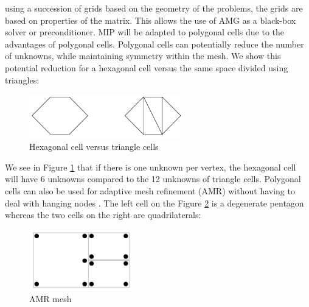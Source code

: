 using a succession of grids based on the geometry of the problems, the grids
are based on properties of the matrix. This allows the use of AMG as a black-box
solver or preconditioner. MIP will be adapted to polygonal cells due to the
advantages of polygonal cells. Polygonal cells can 
potentially reduce the number of unknowns, while maintaining symmetry 
within the mesh. We show this potential reduction for a hexagonal cell versus 
the same space divided using triangles:
\begin{figure}[H]
\centering
\includegraphics[width=0.6\textwidth]{./Introduction/hex_tri_cells}
\caption{Hexagonal cell versus triangle cells}
\label{fig_hex_tri}
\end{figure}
We see in Figure \ref{fig_hex_tri} that if there is one unknown per vertex, 
the hexagonal cell will have 6
unknowns compared to the 12 unknowns of triangle cells. Polygonal cells can
also be used for adaptive mesh refinement (AMR) without having to
deal with hanging nodes 
\cite{locally_hanging_nodes,arbitrary_hanging_nodes,dealII_hanging_nodes}. The 
left cell on the Figure \ref{fig_amr_mesh} is a degenerate pentagon whereas 
the two cells on the right are quadrilaterals:
\begin{figure}[H]
\centering
\includegraphics[width=0.4\textwidth]{./Introduction/amr}
\caption{AMR mesh}
\label{fig_amr_mesh}
\end{figure}

